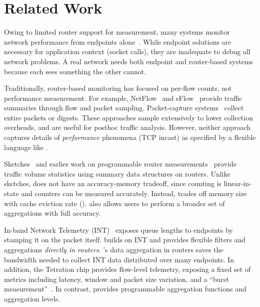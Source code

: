\section{Related Work}
\label{sec:related}
 Owing to limited router support for
measurement, many systems monitor network performance from
endpoints alone~\cite{netpoirot, minlan-snap, dapper-sosr, trumpet,
azure-smartnic}. While endpoint solutions are necessary for application
context (\eg socket calls), they are inadequate to debug all network problems. A
real network needs both endpoint and router-based
systems because each sees something the other cannot.

 Traditionally, router-based monitoring has
focused on per-flow counts, not performance measurement. For example,
NetFlow~\cite{netflow} and sFlow~\cite{sflow} provide traffic summaries
through flow and packet sampling. Packet-capture systems~\cite{cisco-span,
niksun, netsight, everflow, pathdump, path_query} collect entire packets or
digests. These approaches sample extensively to lower collection
overheads, and are useful for posthoc traffic analysis. However, neither
approach captures details of {\em performance} phenomena (\eg TCP incast) as
specified by a flexible language like \TheSystem.

Sketches~\cite{univmon, flowradar, counterbraids, dream} and earlier work
on programmable router measurements~\cite{progme, opensketch} provide traffic
volume statistics using summary data structures on routers.  Unlike sketches,
\TheSystem does
not have an accuracy-memory tradeoff, since counting is
linear-in-state and counters can be measured accurately. Instead, \TheSystem
trades off memory size with cache eviction rate (). \TheSystem also
allows users to perform a broader set of aggregations with full
accuracy.


%

In-band Network Telemetry (INT)~\cite{int, tpp} exposes queue lengths to
endpoints by stamping it on the packet itself. \TheSystem builds on INT and
provides flexible filters and aggregations {\em directly in routers}.
\TheSystem's data aggregation in routers saves
the bandwidth needed to collect INT data distributed over many endpoints.
In addition, the
Tetration chip provides flow-level telemetry, exposing a fixed set of metrics
including latency, window and packet size variation, and a ``burst
measurement''~\cite{tetration-telemetry}. In contrast, \TheSystem provides
programmable aggregation functions and aggregation levels.%

